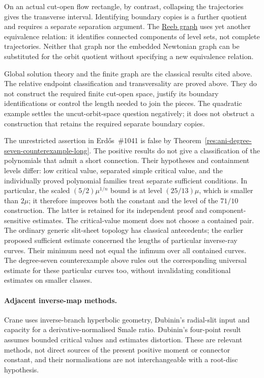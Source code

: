 \documentclass[11pt]{article}
\begin{document}
On an actual cut-open flow rectangle, by contrast, collapsing the
trajectories gives the transverse interval. Identifying boundary copies
is a further quotient and requires a separate separation argument.
The \href{https://arxiv.org/abs/1902.08841v5}{Reeb graph} uses yet another
equivalence relation: it identifies connected components of level sets,
not complete trajectories. Neither that graph nor the embedded Newtonian
graph can be substituted for the orbit quotient without specifying a
new equivalence relation.

Global solution theory and the finite graph are the classical results
cited above. The relative endpoint classification and transversality are proved
above. They do not construct the required finite cut-open space, justify
its boundary identifications or control the length needed to join the
pieces. The quadratic example settles
the uncut-orbit-space question negatively; it does not obstruct a
construction that retains the required separate boundary copies.

The unrestricted assertion in Erd\H{o}s~\#1041 is false by
Theorem~\ref{res:ani-degree-seven-counterexample-long}. The positive
results do not give a classification of the polynomials that admit a
short connection. Their hypotheses and containment levels differ:
low critical value, separated simple critical value, and the individually
proved polynomial families treat separate sufficient conditions.  In particular, the scaled $(5/2)\mu^{1/n}$ bound is at
level $(25/13)\mu$, which is smaller than $2\mu$; it therefore improves
both the constant and the level of the $71/10$ construction.  The latter
is retained for its independent proof and component-sensitive estimates.
The critical-value moment does not choose a contained pair.
The ordinary generic slit-sheet topology has classical antecedents; the
earlier proposed sufficient estimate concerned the lengths of particular
inverse-ray curves. Their minimum need not equal the infimum over all
contained curves. The degree-seven counterexample above rules out the corresponding universal
estimate for these particular curves too, without invalidating conditional
estimates on smaller classes.

\paragraph{Adjacent inverse-map methods.}
Crane \cite[Lemma~2.1, Theorem~2.2 and \S\S3--4]{crane2007smale}
uses inverse-branch hyperbolic geometry, Dubinin's radial-slit input and
capacity for a derivative-normalised Smale ratio.  Dubinin's four-point
result \cite[Theorem~1 and Corollary~4]{dubinin2013fourpoint} assumes
bounded critical values and estimates distortion.  These are relevant
methods, not direct sources of the present positive moment or connector
constant, and their normalisations are not interchangeable with a root-disc
hypothesis.
\end{document}
